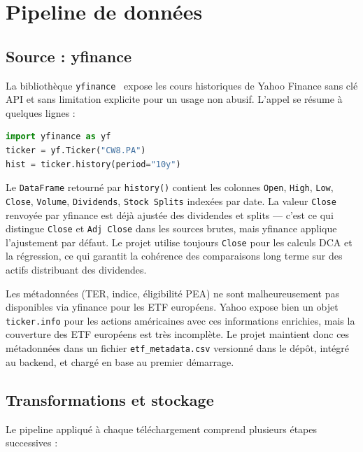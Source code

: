\documentclass[11pt,a4paper]{article}
\begin{document}
\section{Pipeline de données}
\label{sec:pipeline}

\subsection{Source : yfinance}

La bibliothèque \texttt{yfinance}~\cite{yfinance} expose les cours
historiques de Yahoo Finance sans clé API et sans limitation
explicite pour un usage non abusif. L'appel se résume à quelques
lignes :

\begin{lstlisting}[language=Python]
import yfinance as yf
ticker = yf.Ticker("CW8.PA")
hist = ticker.history(period="10y")
\end{lstlisting}

Le \texttt{DataFrame} retourné par \texttt{history()} contient les
colonnes \texttt{Open}, \texttt{High}, \texttt{Low}, \texttt{Close},
\texttt{Volume}, \texttt{Dividends}, \texttt{Stock Splits} indexées
par date. La valeur \texttt{Close} renvoyée par yfinance est déjà
ajustée des dividendes et splits — c'est ce qui distingue
\texttt{Close} et \texttt{Adj Close} dans les sources brutes, mais
yfinance applique l'ajustement par défaut. Le projet utilise
toujours \texttt{Close} pour les calculs DCA et la régression, ce
qui garantit la cohérence des comparaisons long terme sur des actifs
distribuant des dividendes.

Les métadonnées (TER, indice, éligibilité PEA) ne sont
malheureusement pas disponibles via yfinance pour les ETF européens.
Yahoo expose bien un objet \texttt{ticker.info} pour les actions
américaines avec ces informations enrichies, mais la couverture des
ETF européens est très incomplète. Le projet maintient donc ces
métadonnées dans un fichier \texttt{etf\_metadata.csv} versionné
dans le dépôt, intégré au backend, et chargé en base au premier
démarrage.

\subsection{Transformations et stockage}

Le pipeline appliqué à chaque téléchargement comprend plusieurs
étapes successives :
\end{document}
